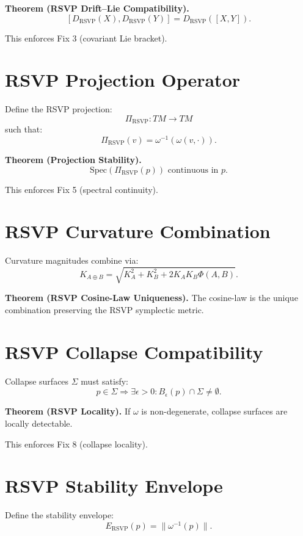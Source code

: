 \documentclass[11pt]{article}
\begin{document}
\textbf{Theorem (RSVP Drift–Lie Compatibility).}
\[
[D_{\mathrm{RSVP}}(X), D_{\mathrm{RSVP}}(Y)]
  = D_{\mathrm{RSVP}}([X,Y]).
\]

This enforces Fix 3 (covariant Lie bracket).

\section{RSVP Projection Operator}

Define the RSVP projection:
\[
\Pi_{\mathrm{RSVP}} : TM \to TM
\]
such that:
\[
\Pi_{\mathrm{RSVP}}(v) = \omega^{-1}(\omega(v,\cdot)).
\]

\textbf{Theorem (Projection Stability).}
\[
\mathrm{Spec}(\Pi_{\mathrm{RSVP}}(p)) \text{ continuous in } p.
\]

This enforces Fix 5 (spectral continuity).

\section{RSVP Curvature Combination}

Curvature magnitudes combine via:
\[
K_{A\oplus B}
  = \sqrt{K_A^2 + K_B^2 + 2 K_A K_B \Phi(A,B)}.
\]

\textbf{Theorem (RSVP Cosine-Law Uniqueness).}
The cosine-law is the unique combination preserving the RSVP symplectic metric.

\section{RSVP Collapse Compatibility}

Collapse surfaces $\Sigma$ must satisfy:
\[
p \in \Sigma \Rightarrow \exists \epsilon > 0 :
B_\epsilon(p) \cap \Sigma \neq \emptyset.
\]

\textbf{Theorem (RSVP Locality).}
If $\omega$ is non-degenerate, collapse surfaces are locally detectable.

This enforces Fix 8 (collapse locality).

\section{RSVP Stability Envelope}

Define the stability envelope:
\[
E_{\mathrm{RSVP}}(p) = \|\omega^{-1}(p)\|.
\]
\end{document}
